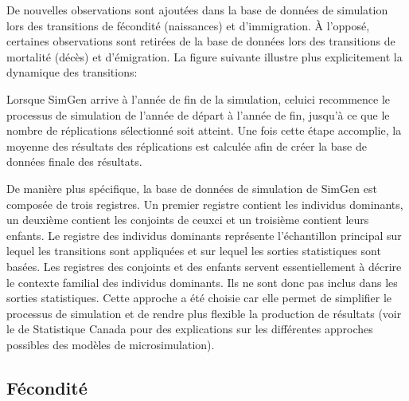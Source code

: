 \documentclass[letterpaper,10pt,french]{sphinxmanual}
\begin{document}
De nouvelles observations sont ajoutées dans la base de données de simulation
lors des transitions de fécondité (naissances) et d’immigration. À l’opposé,
certaines observations sont retirées de la base de données lors des transitions de mortalité (décès) et
d’émigration. La figure suivante illustre plus explicitement la dynamique des transitions:

\begin{figure}[htbp]
\centering

\noindent{}
\end{figure}

Lorsque SimGen arrive à l’année de fin de la simulation, celui\sphinxhyphen{}ci recommence le processus de simulation
de l’année de départ à l’année de fin, jusqu’à ce que le nombre de réplications sélectionné soit atteint.
Une fois cette étape accomplie, la moyenne des résultats des réplications est calculée afin de créer
la base de données finale des résultats.


De manière plus spécifique, la base de données de simulation de SimGen est composée de trois registres. Un premier registre contient les individus dominants, un deuxième contient les conjoints de ceux\sphinxhyphen{}ci et
un troisième contient leurs enfants. Le registre des individus dominants représente l’échantillon principal sur lequel les transitions sont appliquées et sur lequel les sorties statistiques sont basées.
Les registres des conjoints et des enfants servent essentiellement à décrire le contexte familial des individus dominants. Ils ne sont donc pas inclus dans les sorties statistiques.
Cette approche a été choisie car elle permet de simplifier le processus de simulation et de rendre plus flexible la production de résultats
(voir le  de Statistique Canada
pour des explications sur les différentes approches possibles des modèles de microsimulation).


\subsection{Fécondité}
\label{\detokenize{methodologie:fecondite}}
\end{document}
